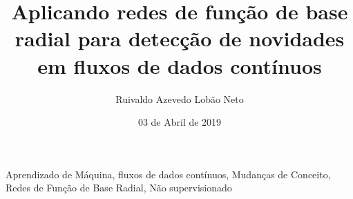 \documentclass[qual, classic, a4paper]{ufbathesis}
\institute{Instituto de Matem\'{a}tica}
\title{Aplicando redes de função de base radial para detecção de novidades em fluxos de dados contínuos}
\date{03 de Abril de 2019}
\author{Ruivaldo Azevedo Lobão Neto}
\begin{document}
\pgcompfrontpage

\frontmatter

\pgcomppresentationpage










\resumo

\blindtext

\begin{keywords}
    Aprendizado de Máquina, fluxos de dados contínuos, Mudanças de Conceito, Redes de Função de Base Radial, Não supervisionado
\end{keywords}
\end{document}
